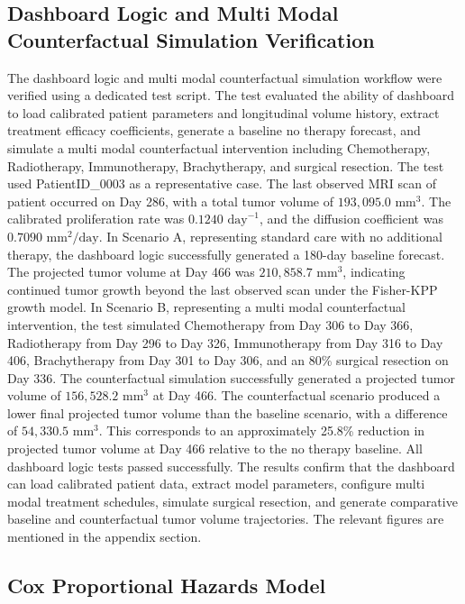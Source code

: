 \subsection{Dashboard Logic and Multi Modal Counterfactual Simulation Verification}

The dashboard logic and multi modal counterfactual simulation workflow were verified using a dedicated test script. The test evaluated the  ability of dashboard to load calibrated patient parameters and longitudinal volume history, extract treatment efficacy coefficients, generate a baseline no therapy forecast, and simulate a multi modal counterfactual intervention including Chemotherapy, Radiotherapy, Immunotherapy, Brachytherapy, and surgical resection. The test used PatientID\_0003 as a representative case. The last observed MRI scan of patient occurred on Day 286, with a total tumor volume of $193,095.0\text{ mm}^3$. The calibrated proliferation rate was $0.1240\text{ day}^{-1}$, and the diffusion coefficient was $0.7090\text{ mm}^2/\text{day}$. In Scenario A, representing standard care with no additional therapy, the dashboard logic successfully generated a 180-day baseline forecast. The projected tumor volume at Day 466 was $210,858.7\text{ mm}^3$, indicating continued tumor growth beyond the last observed scan under the Fisher-KPP growth model. In Scenario B, representing a multi modal counterfactual intervention, the test simulated Chemotherapy from Day 306 to Day 366, Radiotherapy from Day 296 to Day 326, Immunotherapy from Day 316 to Day 406, Brachytherapy from Day 301 to Day 306, and an 80\% surgical resection on Day 336. The counterfactual simulation successfully generated a projected tumor volume of $156,528.2\text{ mm}^3$ at Day 466. The counterfactual scenario produced a lower final projected tumor volume than the baseline scenario, with a difference of $54,330.5\text{ mm}^3$. This corresponds to an approximately 25.8\% reduction in projected tumor volume at Day 466 relative to the no therapy baseline. All dashboard logic tests passed successfully. The results confirm that the dashboard can load calibrated patient data, extract model parameters, configure multi modal treatment schedules, simulate surgical resection, and generate comparative baseline and counterfactual tumor volume trajectories. The relevant figures are mentioned in the appendix section. 

\subsection{Cox Proportional Hazards Model}

